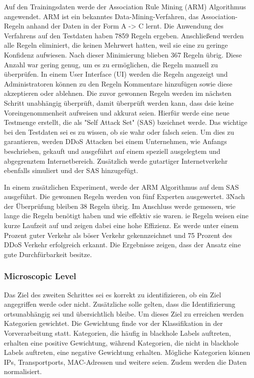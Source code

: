 \documentclass[sigplan,screen]{acmart}
\begin{document}
Auf den Trainingsdaten werde der Association Rule Mining (ARM) Algorithmus angewendet. ARM ist ein bekanntes Data-Mining-Verfahren, das Association-Regeln anhand der Daten in der Form A -> C lernt. Die Anwendung des Verfahrens auf den Testdaten haben 7859 Regeln ergeben. Anschließend werden alle Regeln eliminiert, die keinen Mehrwert hatten, weil sie eine zu geringe Konfidenz aufwiesen. Nach dieser Minimierung blieben 367 Regeln übrig. Diese Anzahl war gering genug, um es zu ermöglichen, die Regeln manuell zu überprüfen. In einem User Interface (UI) werden die Regeln angezeigt und Administratoren können zu den Regeln Kommentare hinzufügen sowie diese akzeptieren oder ablehnen.
Die zuvor gewonnen Regeln werden im nächsten Schritt unabhängig überprüft, damit überprüft werden kann, dass dsie keine Voreingenommenheit aufweisen und akkurat seien.  Hierfür werde eine neue Testmenge erstellt, die als "Self Attack Set" (SAS) bzeichnet werde. Das wichtige bei den Testdaten sei es zu wissen, ob sie wahr oder falsch seien. Um dies zu garantieren, werden DDoS Attacken bei einem Unternehmen, wie Anfangs beschrieben, gekauft und ausgeführt auf einem speziell ausgelegtem und abgegrenztem Internetbereich. Zusätzlich werde gutartiger Internetverkehr ebenfalls simuliert und der SAS hinzugefügt.


In einem zusätzlichen Experiment, werde der ARM Algorithmus auf dem SAS ausgeführt. Die gewonnen Regeln werden von fünf Experten ausgewertet. 3Nach der Überprüfung bleiben 38 Regeln übrig. Im Anschluss werde gemessen, wie lange die Regeln benötigt haben und wie effektiv sie waren. ie Regeln weisen eine kurze Laufzeit auf und zeigen dabei eine hohe Effizienz. Es werde unter einem Prozent guter Verkehr als böser Verkehr gekennzeichnet und 75 Prozent des DDoS Verkehr erfolgreich erkannt. Die Ergebnisse zeigen, dass der Ansatz eine gute Durchfürbarkeit besitze.

\subsubsection{Microscopic Level}
Das Ziel des zweiten Schrittes sei es korrekt zu identifizieren, ob ein Ziel angegriffen werde oder nicht. Zusätzliche solle gelten, dass die Identifizierung ortsunabhängig sei und übersichtlich bleibe. Um dieses Ziel zu erreichen werden Kategorien gewichtet. Die Gewichtung finde vor der Klassifikation in der Vorverarbeitung statt. Kategorien, die häufig in blackhole Labels auftreten, erhalten eine positive Gewichtung, während Kategorien, die nicht in blackhole Labels auftreten, eine negative Gewichtung erhalten. Mögliche Kategorien können IPs, Transportports, MAC-Adressen und weitere seien. Zudem werden die Daten normalisiert.
\end{document}
